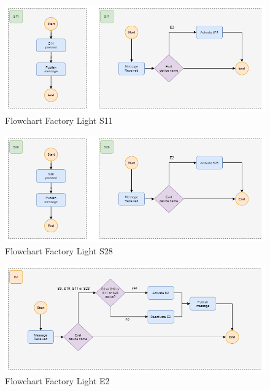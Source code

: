 \begin{figure}[H]
    \centering
    \includegraphics[width=1.0\textwidth]{images/flowchart_factory_light_s11.png}
    \caption{Flowchart Factory Light S11}
    \label{fig:FlowChartFactoryLightS11}
\end{figure}

\begin{figure}[H]
    \centering
    \includegraphics[width=1.0\textwidth]{images/flowchart_factory_light_s28.png}
    \caption{Flowchart Factory Light S28}
    \label{fig:FlowChartFactoryLightS28}
\end{figure}

\begin{figure}[H]
    \centering
    \includegraphics[width=1.0\textwidth]{images/flowchart_factory_light_e2.png}
    \caption{Flowchart Factory Light E2}
    \label{fig:FlowChartFactoryLightE2}
\end{figure}

